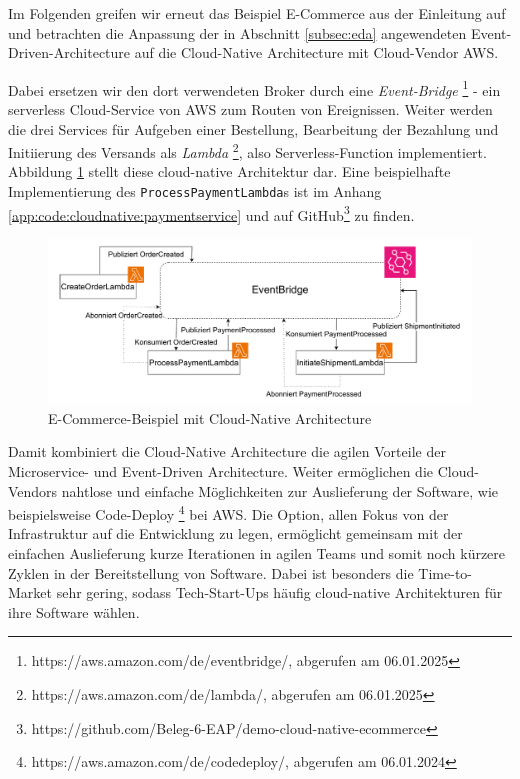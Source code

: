 \documentclass[acmtog]{acmart}
\begin{document}
Im Folgenden greifen wir erneut das Beispiel E-Commerce aus der Einleitung auf und betrachten die Anpassung der in
Abschnitt \ref{subsec:eda} angewendeten Event-Driven-Architecture auf die Cloud-Native Architecture mit Cloud-Vendor AWS\@.

Dabei ersetzen wir den dort verwendeten Broker durch eine \textit{Event-Bridge} \footnote{https://aws.amazon.com/de/eventbridge/, abgerufen am 06.01.2025}
- ein serverless Cloud-Service von AWS zum Routen von Ereignissen.
Weiter werden die drei Services für Aufgeben einer Bestellung, Bearbeitung der Bezahlung und Initiierung des Versands als \textit{Lambda} \footnote{https://aws.amazon.com/de/lambda/, abgerufen am 06.01.2025},
also Serverless-Function implementiert.
Abbildung \ref{fig:cloudnativeecommerce} stellt diese cloud-native Architektur dar.
Eine beispielhafte Implementierung des \texttt{ProcessPaymentLambda}s ist im Anhang \ref{app:code:cloudnative:paymentservice} und auf GitHub\footnote{https://github.com/Beleg-6-EAP/demo-cloud-native-ecommerce} zu finden.
\begin{figure}[!h]
  \centering
  \includegraphics[width=\linewidth]{images/cloud-native/cloud-native-ecommerce.drawio}
  \caption{E-Commerce-Beispiel mit Cloud-Native Architecture}
  \label{fig:cloudnativeecommerce}
\end{figure}

Damit kombiniert die Cloud-Native Architecture die agilen Vorteile der Microservice- und Event-Driven Architecture.
Weiter ermöglichen die Cloud-Vendors nahtlose und einfache Möglichkeiten zur Auslieferung der Software,
wie beispielsweise Code-Deploy \footnote{https://aws.amazon.com/de/codedeploy/, abgerufen am 06.01.2024} bei AWS\@.
Die Option, allen Fokus von der Infrastruktur auf die Entwicklung zu legen, ermöglicht gemeinsam mit der einfachen Auslieferung kurze Iterationen in agilen Teams
und somit noch kürzere Zyklen in der Bereitstellung von Software.
Dabei ist besonders die Time-to-Market sehr gering, sodass Tech-Start-Ups häufig cloud-native Architekturen für ihre Software wählen. %
\end{document}
